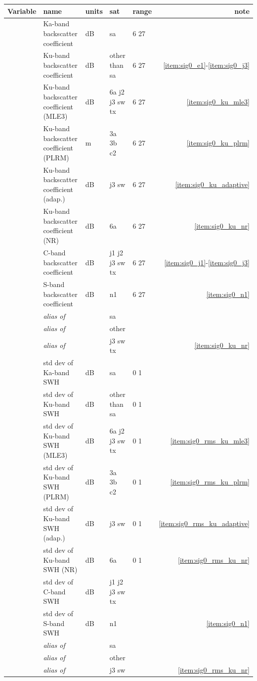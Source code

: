 \documentclass[a4paper,11pt,openany,natbib,nomargin]{thesis}
\newcommand\alias[1]{\emph{alias of} \var{#1}}
\newenvironment{vartable}{
\begin{table}[ht]
\small
\begin{tabular}{lllllr}
\hline\hline
Variable & name & units & sat & range & note \\
\hline\hline
}{
\hline
\end{tabular}
\end{table}
}
\begin{document}
\begin{vartable}
\var{sig0_ka} & Ka-band backscatter coefficient & dB & sa & 6 27 & \\
\var{sig0_ku} & Ku-band backscatter coefficient & dB & other than sa & 6 27 & \ref{item:sig0_e1}-\ref{item:sig0_j3} \\
\var{sig0_ku_mle3} & Ku-band backscatter coefficient (MLE3) & dB & 6a j2 j3 sw tx & 6 27 & \ref{item:sig0_ku_mle3} \\
\var{sig0_ku_plrm} & Ku-band backscatter coefficient (PLRM) & m & 3a 3b c2 & 6 27 & \ref{item:sig0_ku_plrm} \\
\var{sig0_ku_adaptive} & Ku-band backscatter coefficient (adap.) & dB & j3 sw & 6 27 & \ref{item:sig0_ku_adaptive} \\
\var{sig0_ku_nr} & Ku-band backscatter coefficient (NR) & dB & 6a & 6 27 & \ref{item:sig0_ku_nr} \\
\var{sig0_c} & C-band backscatter coefficient & dB & j1 j2 j3 sw tx & 6 27 & \ref{item:sig0_j1}-\ref{item:sig0_j3} \\
\var{sig0_s} & S-band backscatter coefficient & dB & n1 & 6 27 & \ref{item:sig0_n1} \\
\hline
\var{sig0} & \alias{sig0_ka} && sa && \\
\var{sig0} & \alias{sig0_ku} && other && \\
\var{sig0_ku_nr} & \alias{sig0_ku_adaptive} & & j3 sw tx & & \ref{item:sig0_ku_nr} \\
\hline
\hline
\var{sig0_rms_ka} & std dev of Ka-band SWH & dB & sa & 0 1 & \\
\var{sig0_rms_ku} & std dev of Ku-band SWH & dB & other than sa & 0 1 & \\
\var{sig0_rms_ku_mle3} & std dev of Ku-band SWH (MLE3) & dB & 6a j2 j3 sw tx & 0 1 & \ref{item:sig0_rms_ku_mle3} \\
\var{sig0_rms_ku_plrm} & std dev of Ku-band SWH (PLRM) & dB & 3a 3b c2 & 0 1 & \ref{item:sig0_rms_ku_plrm} \\
\var{sig0_rms_ku_adaptive} & std dev of Ku-band SWH (adap.) & dB & j3 sw & 0 1 & \ref{item:sig0_rms_ku_adaptive} \\
\var{sig0_rms_ku_nr} & std dev of Ku-band SWH (NR) & dB & 6a & 0 1 & \ref{item:sig0_rms_ku_nr} \\
\var{sig0_rms_c} & std dev of C-band SWH & dB & j1 j2 j3 sw tx & & \\
\var{sig0_rms_s} & std dev of S-band SWH & dB & n1 & & \ref{item:sig0_n1} \\
\hline
\var{sig0_rms} & \alias{sig0_rms_ka} && sa && \\
\var{sig0_rms} & \alias{sig0_rms_ku} && other && \\
\var{sig0_rms_ku_nr} & \alias{sig0_rms_ku_adaptive} & & j3 sw & & \ref{item:sig0_rms_ku_nr} \\
\end{vartable}
\end{document}
